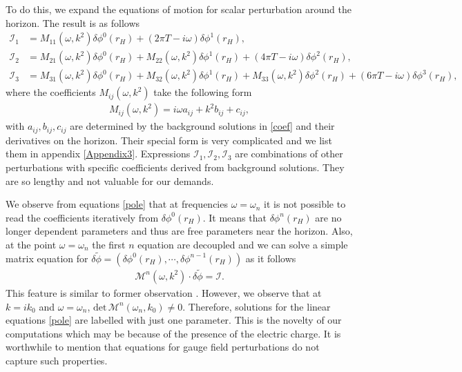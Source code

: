 \documentclass[preprintnumbers,aps,prd,longbibliography,nofootinbib,nobibnotes,amsmath,amssymb]{revtex4}
\begin{document}
To do this, we expand the equations of motion for scalar perturbation around the horizon. The result is as follows
\begin{align}\label{pole}
	\mathcal{I}_{1} & = M_{1 1}(\omega, k^2) \delta \phi^0(r_H) + (2 \pi T - i \omega) \delta \phi^1(r_H),\nonumber\\
	\mathcal{I}_{2} & = M_{2 1}(\omega, k^2) \delta \phi^0(r_H) + M_{2 2}(\omega, k^2) \delta \phi^1(r_H) + (4 \pi T - i \omega) \delta \phi^2(r_H),\\
	\mathcal{I}_{3} & = M_{3 1}(\omega, k^2) \delta \phi^0(r_H) + M_{3 2}(\omega, k^2) \delta \phi^1(r_H) + M_{3 3}(\omega, k^2) \delta \phi^2(r_H) +  (6 \pi T - i \omega) \delta \phi^3(r_H),\nonumber
\end{align}
where the coefficients $M_{i j}(\omega, k^2)$ take the following form
\begin{align}
	M_{i j}(\omega, k^2) = i \omega a_{i j} + k^2 b_{i j} + c_{i j},
\end{align}
with $a_{i j}, b_{i j}, c_{i j}$ are determined by the background solutions in \eqref{coef} and their derivatives on the horizon. Their special form is very complicated and we list them in appendix \ref{Appendix3}. Expressions $\mathcal{I}_{1}, \mathcal{I}_{2}, \mathcal{I}_{3}$ are combinations of other perturbations with specific coefficients derived from  background solutions. They are so lengthy and not valuable for our demands.



We observe  from equations \eqref{pole} that at frequencies $\omega = \omega_n$ it is not possible to read the coefficients iteratively from $\delta \phi^0(r_H)$. It means that $\delta \phi^n(r_H)$ are no longer dependent parameters and thus are free parameters near the horizon. Also, at the point $\omega = \omega_n$ the first $n$ equation are decoupled and we can solve a simple matrix equation for $\delta \tilde{\phi} = \left(\delta \phi^0(r_H), \cdots, \delta \phi^{n-1}(r_H)\right)$ as it follows
\begin{align}
	\mathcal{M}^{n}(\omega, k^2) \cdot \delta \tilde{\phi}= \mathcal{I}.
\end{align} 
This feature is similar to former observation \cite{Grozdanov:2019uhi, Grozdanov:2023txs, Blake:2019otz}. However, we observe that at $k = i k_0$ and $\omega = \omega_n$, $\mbox{det}\, \mathcal{M}^n(\omega_n, k_0) \neq 0$. Therefore, solutions for the linear equations \eqref{pole} are labelled with just one parameter. This is the novelty of our computations which may be because of the presence of the electric charge. It is worthwhile to mention that equations for gauge field perturbations do not capture such properties.
\end{document}

